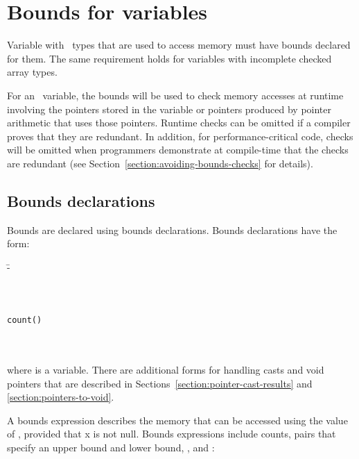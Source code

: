 
\chapter{Bounds for variables}
\label{chapter:tracking-bounds}

Variable with \arrayptr\ types that are used to access
memory must have bounds declared for them.  The same requirement
holds for variables with incomplete checked array types.

For an \arrayptr\ variable, the bounds will be used to check
memory accesses at runtime involving the pointers stored in the variable
or pointers produced by pointer arithmetic that uses those pointers.
Runtime checks can be omitted if a compiler proves that they are
redundant. In addition, for performance-critical code, checks will be
omitted when programmers demonstrate at compile-time that the checks are
redundant (see Section~\ref{section:avoiding-bounds-checks} for details).

\section{Bounds declarations}
\label{section:bounds-declarations}

Bounds are declared using bounds declarations. Bounds declarations have
the form:

\begin{tabbing}
\=- \\
\>  \\
\\
 \\
\> \texttt{count(}\texttt{)} \\
\>  \\
\> \boundsnone \\
\> \boundsany
\end{tabbing}

where  is a variable. There are additional forms for handling
casts and void pointers that are described in 
Sections~\ref{section:pointer-cast-results} and \ref{section:pointers-to-void}.

A bounds expression describes the memory that can be accessed using the
value of , provided that x is not null. Bounds expressions
include counts, pairs that specify an upper bound and lower bound,
\boundsnone, and \boundsany:

